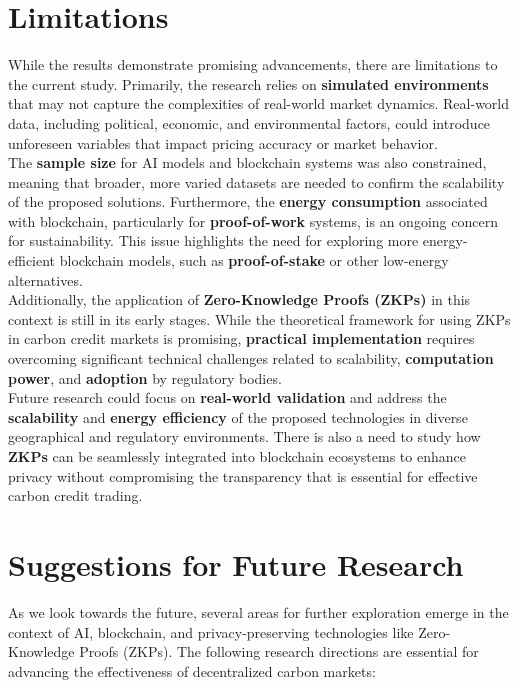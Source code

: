 \documentclass[preprint,12pt]{elsarticle}
\begin{document}
\section{Limitations}
While the results demonstrate promising advancements, there are limitations to the current study. Primarily, the research relies on \textbf{simulated environments} that may not capture the complexities of real-world market dynamics. Real-world data, including political, economic, and environmental factors, could introduce unforeseen variables that impact pricing accuracy or market behavior.\\
The \textbf{sample size} for AI models and blockchain systems was also constrained, meaning that broader, more varied datasets are needed to confirm the scalability of the proposed solutions. Furthermore, the \textbf{energy consumption} associated with blockchain, particularly for \textbf{proof-of-work} systems, is an ongoing concern for sustainability. This issue highlights the need for exploring more energy-efficient blockchain models, such as \textbf{proof-of-stake} or other low-energy alternatives.\\
Additionally, the application of \textbf{Zero-Knowledge Proofs (ZKPs)} in this context is still in its early stages. While the theoretical framework for using ZKPs in carbon credit markets is promising, \textbf{practical implementation} requires overcoming significant technical challenges related to scalability, \textbf{computation power}, and \textbf{adoption} by regulatory bodies.\\
Future research could focus on \textbf{real-world validation} and address the \textbf{scalability} and \textbf{energy efficiency} of the proposed technologies in diverse geographical and regulatory environments. There is also a need to study how \textbf{ZKPs} can be seamlessly integrated into blockchain ecosystems to enhance privacy without compromising the transparency that is essential for effective carbon credit trading.
\section{Suggestions for Future Research}
As we look towards the future, several areas for further exploration emerge in the context of AI, blockchain, and privacy-preserving technologies like Zero-Knowledge Proofs (ZKPs). The following research directions are essential for advancing the effectiveness of decentralized carbon markets:
\end{document}

